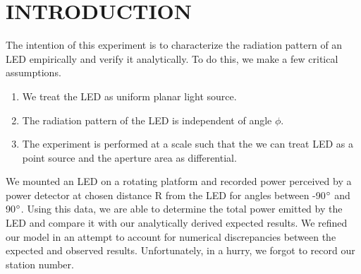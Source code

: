 \section{INTRODUCTION}
The intention of this experiment is to characterize the radiation pattern of an LED empirically and verify it analytically. To do this, we make a few critical assumptions.
\begin{enumerate}
\item We treat the LED as uniform planar light source.
\item The radiation pattern of the LED is independent of angle $\phi$.
\item The experiment is performed at a scale such that the we can treat LED as a point source and the aperture area as differential.
\end{enumerate}

We mounted an LED on a rotating platform and recorded power perceived by a power detector at chosen distance R from the LED for angles between -90$\degree$ and 90$\degree$. Using this data, we are able to determine the total power emitted by the LED and compare it with our analytically derived expected results. We refined our model in an attempt to account for numerical discrepancies between the expected and observed results. Unfortunately, in a hurry, we forgot to record our station number.